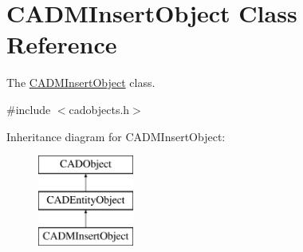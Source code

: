 \hypertarget{class_c_a_d_m_insert_object}{}\section{C\+A\+D\+M\+Insert\+Object Class Reference}
\label{class_c_a_d_m_insert_object}


The \hyperlink{class_c_a_d_m_insert_object}{C\+A\+D\+M\+Insert\+Object} class.  




{\ttfamily \#include $<$cadobjects.\+h$>$}

Inheritance diagram for C\+A\+D\+M\+Insert\+Object\+:\begin{figure}[H]
\begin{center}
\leavevmode
\includegraphics[height=3.000000cm]{class_c_a_d_m_insert_object}
\end{center}
\end{figure}
